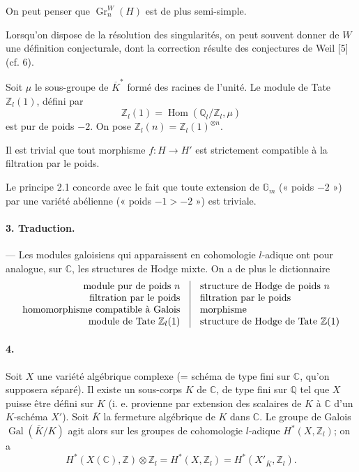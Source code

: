 \documentclass[10pt]{article}
\newcommand{\C}{\mathbb C}
\newcommand{\Q}{\mathbb Q}
\newcommand{\Z}{\mathbb Z}
\newcommand{\Gm}{\mathbb G_m}
\newcommand{\Gr}{\operatorname{Gr}}
\newcommand{\Gal}{\operatorname{Gal}}
\newcommand{\Hom}{\operatorname{Hom}}
\newcommand{\barK}{\overline{K}}
\begin{document}
On peut penser que $\Gr_n^W(H)$ est de plus semi-simple.

Lorsqu'on dispose de la résolution des singularités, on peut souvent donner de $W$ une définition conjecturale, dont la correction résulte des conjectures de Weil [5] (cf. 6).

Soit $\mu$ le sous-groupe de $\barK^*$ formé des racines de l'unité. Le module de Tate $\Z_l(1)$, défini par
\[
\Z_l(1)=\Hom(\Q_l/\Z_l,\mu)
\]
est pur de poids $-2$. On pose $\Z_l(n)=\Z_l(1)^{\otimes n}$.

Il est trivial que tout morphisme $f:H\to H'$ est strictement compatible à la filtration par le poids.

Le principe 2.1 concorde avec le fait que toute extension de $\Gm$ (« poids $-2$ ») par une variété abélienne (« poids $-1>-2$ ») est triviale.

\paragraph{3. Traduction.} — Les modules galoisiens qui apparaissent en cohomologie $l$-adique ont pour analogue, sur $\C$, les structures de Hodge mixte. On a de plus le dictionnaire
\[
\begin{array}{r@{\quad\vrule\quad}l}
\text{module pur de poids }n & \text{structure de Hodge de poids }n\\
\text{filtration par le poids} & \text{filtration par le poids}\\
\text{homomorphisme compatible à Galois} & \text{morphisme}\\
\text{module de Tate }\Z_l(1) & \text{structure de Hodge de Tate }\Z(1)
\end{array}
\]

\paragraph{4.} Soit $X$ une variété algébrique complexe (= schéma de type fini sur $\C$, qu'on supposera séparé). Il existe un sous-corps $K$ de $\C$, de type fini sur $\Q$ tel que $X$ puisse être défini sur $K$ (i. e. provienne par extension des scalaires de $K$ à $\C$ d'un $K$-schéma $X'$). Soit $\barK$ la fermeture algébrique de $K$ dans $\C$. Le groupe de Galois $\Gal(\barK/K)$ agit alors sur les groupes de cohomologie $l$-adique $H^*(X,\Z_l)$; on a
\[
H^*(X(\C),\Z)\otimes\Z_l=H^*(X,\Z_l)=H^*(X'_{\barK},\Z_l).
\]
\end{document}
